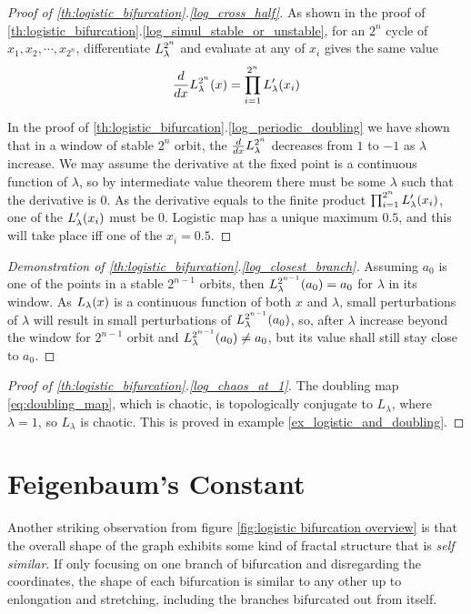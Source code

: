 \begin{proof}[Proof of \ref{th:logistic_bifurcation}.\ref{log_cross_half}]
	As shown in the proof of \ref{th:logistic_bifurcation}.\ref{log_simul_stable_or_unstable}, for an $2^n$ cycle of $x_1, x_2, \cdots, x_{2^n}$, differentiate $L_{\lambda}^{2^n}$ and evaluate at any of $x_i$ gives the same value
	$$
	\frac{d}{dx} L_{\lambda}^{2^n}(x) = \prod_{i=1}^{2^n} L_{\lambda}'(x_i)
	$$
	
	In the proof of \ref{th:logistic_bifurcation}.\ref{log_periodic_doubling} we have shown that in a window of stable $2^n$ orbit, the $\frac{d}{dx} L_{\lambda}^{2^n}$ decreases from $1$ to $-1$ as $\lambda$ increase.
	We may assume the derivative at the fixed point is a continuous function of $\lambda$, so by intermediate value theorem there must be some $\lambda$ such that the derivative is $0$. 
	As the derivative equals to the finite product $\prod_{i=1}^{2^n} L_{\lambda}'(x_i)$, one of the $L_{\lambda}'(x_i)$ must be $0$.
	Logistic map has a unique maximum $0.5$, and this will take place iff one of the $x_i = 0.5$.
\end{proof}

\begin{proof}[Demonstration of \ref{th:logistic_bifurcation}.\ref{log_closest_branch}]
	Assuming $a_0$ is one of the points in a stable $2^{n-1}$ orbits, then $L_{\lambda}^{2^{n-1}}(a_0)=a_0$ for $\lambda$ in its window.
	As $L_{\lambda}(x)$ is a continuous function of both $x$ and $\lambda$, small perturbations of $\lambda$ will result in small perturbations of $L_{\lambda}^{2^{n-1}}(a_0)$, so, after $\lambda$ increase beyond the window for $2^{n-1}$ orbit and $L_{\lambda}^{2^{n-1}}(a_0) \neq a_0$, but its value shall still stay close to $a_0$.
\end{proof}


\begin{proof}[Proof of \ref{th:logistic_bifurcation}.\ref{log_chaos_at_1}]
	The doubling map \eqref{eq:doubling_map}, which is chaotic, is topologically conjugate to $L_{\lambda}$, where $\lambda = 1$, so $L_{\lambda}$ is chaotic.
	This is proved in example \ref{ex_logistic_and_doubling}.
\end{proof}

\section{Feigenbaum's Constant}

Another striking observation from figure \ref{fig:logistic bifurcation overview} is that the overall shape of the graph exhibits some kind of fractal structure that is \emph{self similar}.
If only focusing on one branch of bifurcation and disregarding the coordinates, the shape of each bifurcation is similar to any other up to enlongation and stretching, including the branches bifurcated out from itself.
 
